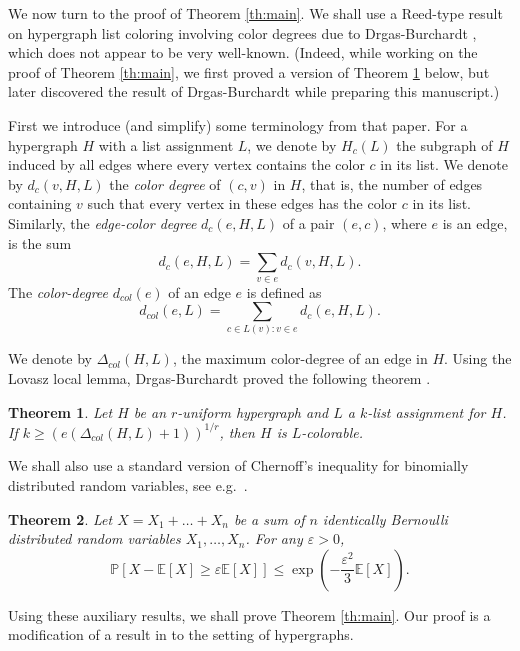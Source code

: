 \documentclass[12pt]{article}
\newtheorem{theorem}{Theorem}[section]
\newcommand{\1}{\mathds{1}}
\begin{document}
\bigskip


We now turn to the proof of Theorem \ref{th:main}.
We shall use a Reed-type result on hypergraph list coloring involving color degrees
due to Drgas-Burchardt \cite{Drgas}, which does not appear to be very well-known. (Indeed, while working
on the proof of Theorem \ref{th:main}, we first proved a version of Theorem \ref{th:Drgas} below, but later discovered
the result of Drgas-Burchardt while preparing this manuscript.)


First we introduce (and simplify) some terminology from that paper.
%
For a hypergraph $H$ with a list assignment $L$, we denote by $H_c(L)$ the subgraph of $H$ induced by all edges where every vertex contains the color $c$ in its list. We denote by $d_{c}(v,H,L)$ 
the {\em color degree} of $(c,v)$ in $H$, that is, the number of edges containing
$v$ such that every vertex in these edges has the color $c$ in its list. Similarly, the {\em edge-color degree}
$d_{c}(e, H, L)$ of a pair $(e,c)$, where $e$ is an edge, is the sum
%
$$d_{c}(e,H,L) = \sum_{v \in e} d_{c}(v,H,L).$$
%
The {\em color-degree} $d_{col}(e)$ of an edge $e$ is defined as
$$d_{col}(e,L) = \sum_{c \in L(v) : v \in e} d_{c}(e,H,L).$$

We denote by $\Delta_{col}(H,L)$, the maximum color-degree of an edge in $H$. 
Using the Lovasz local lemma, Drgas-Burchardt proved the following theorem \cite{Drgas}.

\begin{theorem}
\label{th:Drgas}
	Let $H$ be an $r$-uniform hypergraph and $L$ a $k$-list assignment for $H$.
	If $k \geq \left(e (\Delta_{col}(H,L) +1) \right)^{1/r}$, then $H$ is $L$-colorable.
\end{theorem}

We shall also use a standard version of Chernoff's inequality for binomially distributed random variables,
see e.g.~\cite{Janson}. %

\begin{theorem}
%
Let $X= X_1 + \dots + X_n$ be a sum of $n$ identically Bernoulli distributed random variables $X_1,\dots, X_n$.
For any $\varepsilon >0$,
$$\mathbb{P}[X-\mathbb{E}[X] \geq \varepsilon\mathbb{E}[X]] \leq
\exp\left(-\frac{\varepsilon^2}{3}\mathbb{E}[X]\right).$$
%
\end{theorem}


Using these auxiliary results, we shall prove Theorem \ref{th:main}. Our proof is a modification of a result
in \cite{AlonAssadi} to the setting of hypergraphs.
\end{document}
